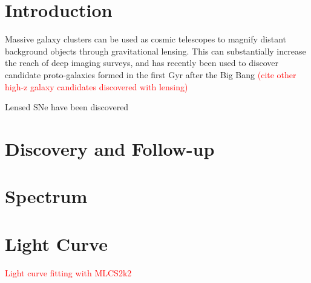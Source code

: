 
\section{Introduction}
\label{sec:Introduction}

Massive galaxy clusters can be used as cosmic telescopes to magnify
distant background objects through gravitational lensing.  This can
substantially increase the reach of deep imaging surveys, and has
recently been used to discover candidate proto-galaxies formed in the
first Gyr after the Big
Bang \citep{Zheng:2012,Coe:2013,} 
\textcolor{red}{(cite other high-z galaxy candidates discovered with lensing)}

Lensed SNe have been discovered
\textcolor{red}{\citep{Goobar:2009,Riehm:2011,Patel:2014,Nordin:2014,}}


\section{Discovery and Follow-up}
\label{sec:DiscoveryAndFollowUp}

\section{Spectrum}
\label{sec:Spectrum}


\section{Light Curve}
\label{sec:LightCurve}

\textcolor{red}{Light curve fitting with MLCS2k2}


